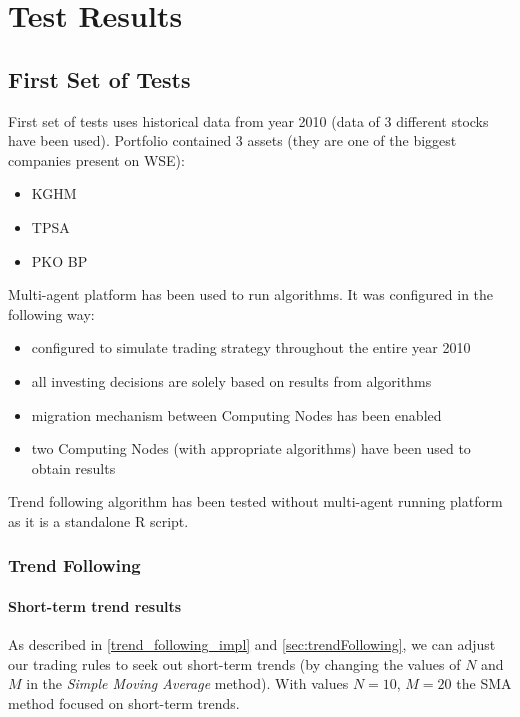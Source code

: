 \chapter{Test Results}
\label{cha:tests}

\section{First Set of Tests}
\label{sec:first_set_of_tests}

First set of tests uses historical data from year 2010 (data of 3 different stocks have been used). 
Portfolio contained 3 assets (they are one of the biggest companies present on WSE):

\begin{itemize} 
  \item KGHM
  \item TPSA
  \item PKO BP
\end{itemize}

Multi-agent platform has been used to run algorithms.
It was configured in the following way: 

\begin{itemize}
  \item configured to simulate trading strategy throughout the entire year 2010
  \item all investing decisions are solely based on results from algorithms
  \item migration mechanism between Computing Nodes has been enabled
  \item two Computing Nodes (with appropriate algorithms) have been used to obtain results
\end{itemize}

Trend following algorithm has been tested without multi-agent running platform as it is a standalone R script.

\subsection{Trend Following}

\subsubsection{Short-term trend results}
\label{short-term}

As described in \ref{trend_following_impl} and \ref{sec:trendFollowing}, we can adjust our trading rules to seek out short-term trends
 (by changing the values of $N$ and $M$ in the \emph{Simple Moving Average} method).
With values $N = 10$, $M = 20$ the SMA method focused on short-term trends.
 

